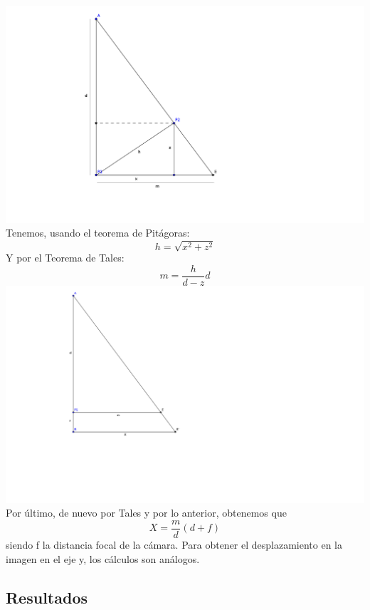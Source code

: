 \documentclass[a4paper,openright, 12pt]{book}
\begin{document}
\includegraphics{tales1}
\newpage
Tenemos, usando el teorema de Pitágoras:
\begin{equation*}
h=\sqrt{x^2 + z^2}
\end{equation*}
Y por el Teorema de Tales:
\begin{equation*}
m = \dfrac{h}{d-z}d
\end{equation*}
\includegraphics{tales2}
Por último, de nuevo por Tales y por lo anterior, obtenemos que
\begin{equation*}
X=\dfrac{m}{d}(d+f)
\end{equation*}
siendo f la distancia focal de la cámara.
Para obtener el desplazamiento en la imagen en el eje y, los cálculos son análogos.
\newpage

\newpage

\subsection{Resultados}
\end{document}
